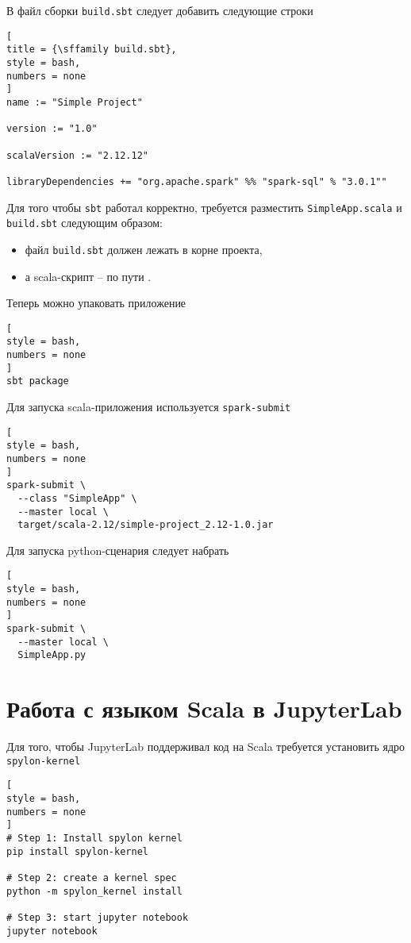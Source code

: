 \documentclass[%
	11pt,
	a4paper,
	utf8,
		]{article}
\begin{document}
В файл сборки \texttt{build.sbt} следует добавить следующие строки
\begin{lstlisting}[
title = {\sffamily build.sbt},
style = bash,
numbers = none	
]
name := "Simple Project"

version := "1.0"

scalaVersion := "2.12.12"

libraryDependencies += "org.apache.spark" %% "spark-sql" % "3.0.1""
\end{lstlisting}

Для того чтобы \texttt{sbt} работал корректно, требуется разместить \texttt{SimpleApp.scala} и \texttt{build.sbt} следующим образом:
\begin{itemize}
	\item файл \texttt{build.sbt} должен лежать в корне проекта,
	
	\item а scala-скрипт -- по пути .
\end{itemize}

Теперь можно упаковать приложение
\begin{lstlisting}[
style = bash,
numbers = none	
]
sbt package
\end{lstlisting}

Для запуска scala-приложения используется \texttt{spark-submit}
\begin{lstlisting}[
style = bash,
numbers = none	
]
spark-submit \
  --class "SimpleApp" \
  --master local \
  target/scala-2.12/simple-project_2.12-1.0.jar
\end{lstlisting}

Для запуска python-сценария следует набрать
\begin{lstlisting}[
style = bash,
numbers = none	
]
spark-submit \
  --master local \
  SimpleApp.py
\end{lstlisting}



\section{Работа с языком Scala в JupyterLab}

Для того, чтобы JupyterLab поддерживал код на Scala требуется установить ядро \texttt{spylon-kernel}
\begin{lstlisting}[
style = bash,
numbers = none	
]
# Step 1: Install spylon kernel
pip install spylon-kernel

# Step 2: create a kernel spec
python -m spylon_kernel install

# Step 3: start jupyter notebook 
jupyter notebook
\end{lstlisting}
\end{document}
